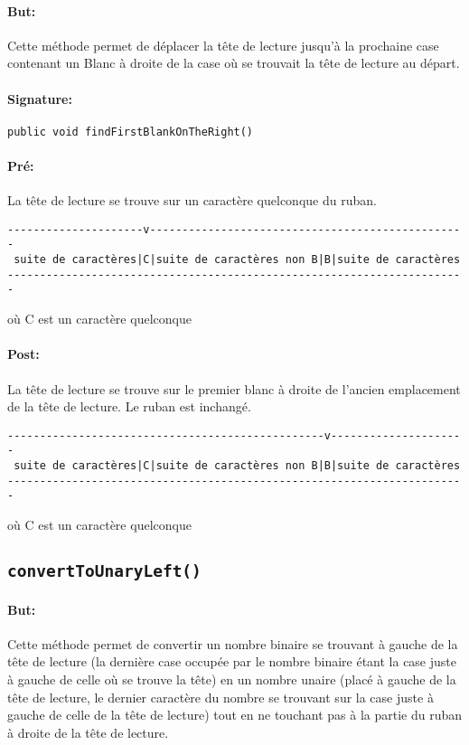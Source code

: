 \documentclass[a4paper,11pt]{article}
\begin{document}
\paragraph{But:} Cette méthode permet de déplacer la t\^ete de lecture jusqu'à la prochaine case contenant un Blanc à droite de la case où se trouvait la tête de lecture au départ.
\paragraph{Signature:} \texttt{public void findFirstBlankOnTheRight()}
\paragraph{Pré:} La tête de lecture se trouve sur un caractère quelconque du ruban.
\begin{verbatim}
---------------------v-------------------------------------------------
 suite de caractères|C|suite de caractères non B|B|suite de caractères
-----------------------------------------------------------------------
\end{verbatim}
où C est un caractère quelconque
\paragraph{Post:} La tête de lecture se trouve sur le premier blanc à droite de l'ancien emplacement de la tête de lecture. Le ruban est inchangé.
\begin{verbatim}
-------------------------------------------------v---------------------
 suite de caractères|C|suite de caractères non B|B|suite de caractères
-----------------------------------------------------------------------
\end{verbatim}
où C est un caractère quelconque
\subsection{\texttt{convertToUnaryLeft()}}
\paragraph{But:} Cette méthode permet de convertir un nombre binaire se trouvant à gauche de la tête de lecture (la dernière case occupée par le nombre binaire étant la case juste à gauche de celle où se trouve la tête) en un nombre unaire (placé à gauche de la tête de lecture, le dernier caractère du nombre se trouvant sur la case juste à gauche de celle de la tête de lecture) tout en ne touchant pas à la partie du ruban à droite de la tête de lecture.
\end{document}

